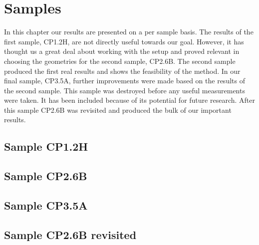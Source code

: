 \chapter{Samples}
In this chapter our results are presented on a per sample basis. The results of the first sample, CP1.2H, are not directly useful towards our goal. However, it has thought us a great deal about working with the setup and proved relevant in choosing the geometries for the second sample, CP2.6B. The second sample produced the first real results and shows the feasibility of the method. In our final sample, CP3.5A, further improvements were made based on the results of the second sample. This sample was destroyed before any useful measurements were taken. It has been included because of its potential for future research. After this sample CP2.6B was revisited and produced the bulk of our important results.

\section{Sample CP1.2H}


\newpage
\section{Sample CP2.6B}


\newpage
\section{Sample CP3.5A}


\newpage
\section{Sample CP2.6B revisited}
